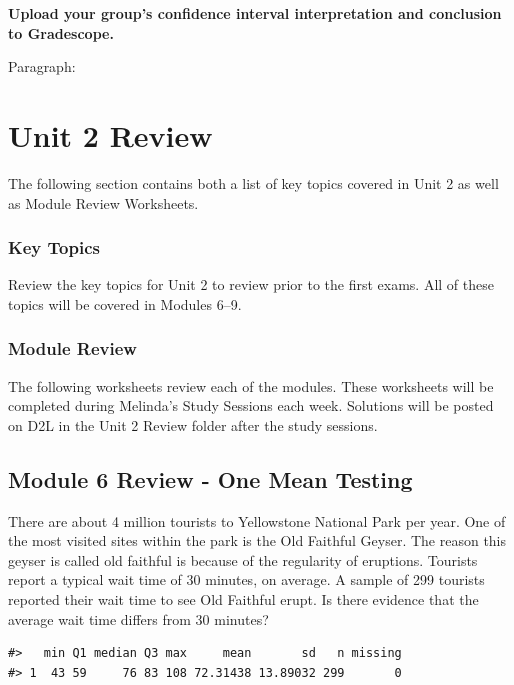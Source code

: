\documentclass[
]{report}
\begin{document}
\textbf{Upload your group's confidence interval interpretation and conclusion to Gradescope.}

\newpage

Paragraph:

\newpage

\chapter{Unit 2 Review}\label{unit-2-review}

The following section contains both a list of key topics covered in Unit 2 as well as Module Review Worksheets.

\subsection{Key Topics}\label{key-topics-9}

Review the key topics for Unit 2 to review prior to the first exams. All of these topics will be covered in Modules 6--9.

\subsection{Module Review}\label{module-review-1}


The following worksheets review each of the modules. These worksheets will be completed during Melinda's Study Sessions each week. Solutions will be posted on D2L in the Unit 2 Review folder after the study sessions.

\newpage

\section{Module 6 Review - One Mean Testing}\label{module-6-review---one-mean-testing}

There are about 4 million tourists to Yellowstone National Park per year. One of the most visited sites within the park is the Old Faithful Geyser. The reason this geyser is called old faithful is because of the regularity of eruptions. Tourists report a typical wait time of 30 minutes, on average. A sample of 299 tourists reported their wait time to see Old Faithful erupt. Is there evidence that the average wait time differs from 30 minutes?

\begin{verbatim}
#>   min Q1 median Q3 max     mean       sd   n missing
#> 1  43 59     76 83 108 72.31438 13.89032 299       0
\end{verbatim}
\end{document}

